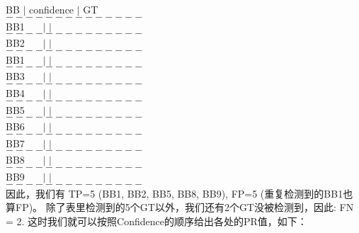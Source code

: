 \documentclass{article}
\begin{document}
\begin{CJK}{UTF8}{gbsn}
BB  \quad $|$ \quad confidence \quad $|$ \quad GT\\
$--------------$\\
BB1 \ \ \  $|$ \quad {} \quad \quad \quad $|$ \\
$--------------$\\
BB2 \ \ \  $|$ \quad {} \quad \quad \quad $|$ \\
$--------------$\\
BB1 \ \ \  $|$ \quad {} \quad \quad \quad $|$ \\
$--------------$\\
BB3 \ \ \  $|$ \quad {} \quad \quad \quad $|$ \\
$--------------$\\
BB4 \ \ \  $|$ \quad {} \quad \quad \quad $|$ \\
$--------------$\\
BB5 \ \ \  $|$ \quad {} \quad \quad \quad $|$ \\
$--------------$\\
BB6 \ \ \  $|$ \quad {} \quad \quad \quad $|$ \\
$--------------$\\
BB7 \ \ \  $|$ \quad {} \quad \quad \quad $|$ \\
$--------------$\\
BB8 \ \ \  $|$ \quad {} \quad \quad \quad $|$ \\
$--------------$\\
BB9 \ \ \  $|$ \quad {} \quad \quad \quad $|$ \\
$--------------$\\
因此，我们有 TP=5 (BB1, BB2, BB5, BB8, BB9), FP=5 (重复检测到的BB1也算FP)。
除了表里检测到的5个GT以外，我们还有2个GT没被检测到，因此: FN = 2.
 这时我们就可以按照Confidence的顺序给出各处的PR值，如下：


\end{CJK}
\end{document}
